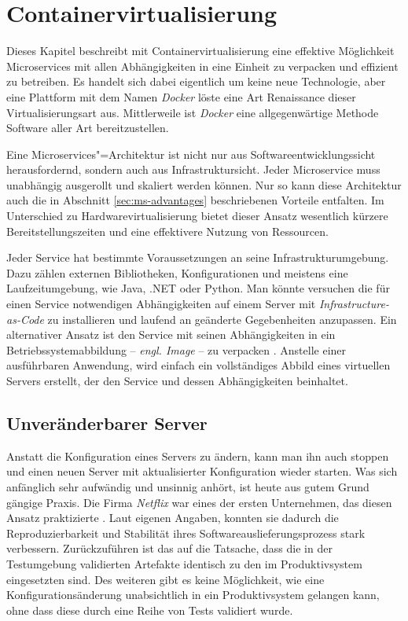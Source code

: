 \chapter{Containervirtualisierung}

Dieses Kapitel beschreibt mit Containervirtualisierung eine effektive Möglichkeit Microservices mit allen Abhängigkeiten in eine Einheit zu verpacken und effizient zu betreiben. Es handelt sich dabei eigentlich um keine neue Technologie, aber eine Plattform mit dem Namen \textit{Docker} löste eine Art Renaissance dieser Virtualisierungsart aus. Mittlerweile ist \textit{Docker} eine allgegenwärtige Methode Software aller Art bereitzustellen.

Eine Microservices"=Architektur ist nicht nur aus Softwareentwicklungssicht herausfordernd, sondern auch aus Infrastruktursicht. Jeder Microservice muss unabhängig ausgerollt und skaliert werden können. Nur so kann diese Architektur auch die in Abschnitt \ref{sec:ms-advantages} beschriebenen Vorteile entfalten.  Im Unterschied zu Hardwarevirtualisierung bietet dieser Ansatz wesentlich kürzere Bereitstellungszeiten und eine effektivere Nutzung von Ressourcen.

Jeder Service hat bestimmte Voraussetzungen an seine Infrastrukturumgebung. Dazu zählen externen Bibliotheken, Konfigurationen und meistens eine Laufzeitumgebung, wie \zB Java, .NET oder Python. Man könnte versuchen die für einen Service notwendigen Abhängigkeiten auf einem Server mit \textit{Infrastructure-as-Code} zu installieren und laufend an geänderte Gegebenheiten anzupassen. Ein alternativer Ansatz ist den Service mit seinen Abhängigkeiten in ein Betriebssystemabbildung -- \textit{engl. Image} -- zu verpacken \cite[113]{newman2015building}. Anstelle einer ausführbaren Anwendung, wird einfach ein vollständiges Abbild eines virtuellen Servers erstellt, der den Service und dessen Abhängigkeiten beinhaltet.

\section{Unveränderbarer Server}

Anstatt die Konfiguration eines Servers zu ändern, kann man ihn auch stoppen und einen neuen Server mit aktualisierter Konfiguration wieder starten. Was sich anfänglich sehr aufwändig und unsinnig anhört, ist heute aus gutem Grund gängige Praxis. Die Firma \textit{Netflix} war eines der ersten Unternehmen, das diesen Ansatz praktizierte \cite{NflxLegos}. Laut eigenen Angaben, konnten sie dadurch die Reproduzierbarkeit und Stabilität ihres Softwareauslieferungsprozess stark verbessern. Zurückzuführen ist das auf die Tatsache, dass die in der Testumgebung validierten Artefakte identisch zu den im Produktivsystem eingesetzten sind. Des weiteren gibt es keine Möglichkeit, wie eine Konfigurationsänderung unabsichtlich in ein Produktivsystem gelangen kann, ohne dass diese durch eine Reihe von Tests validiert wurde.

